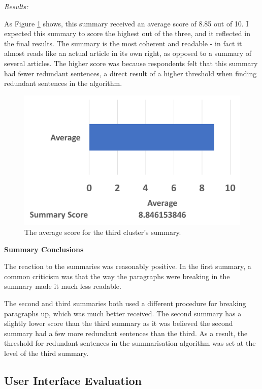 \documentclass[12pt]{article}
\begin{document}
\emph{Results:}

As Figure \ref{summ3} shows, this summary received an average score of 8.85 out of 10. I expected this summary to score the highest out of the three, and it reflected in the final results. The summary is the most coherent and readable - in fact it almost reads like an actual article in its own right, as opposed to a summary of several articles. The higher score was because respondents felt that this summary had fewer redundant sentences, a direct result of a higher threshold when finding redundant sentences in the algorithm. \\

\begin{figure}[ht!]
  \centering
    \includegraphics[scale=0.6]{summ3score.png}
   \caption[The average score for a summary]{The average score for the third cluster's summary.}
   \label{summ3}
\end{figure} 

\textbf{Summary Conclusions}

The reaction to the summaries was reasonably positive. In the first summary, a common criticism was that the way the paragraphs were breaking in the summary made it much less readable. 

The second and third summaries both used a different procedure for breaking paragraphs up, which was much better received. The second summary has a slightly lower score than the third summary as it was believed the second summary had a few more redundant sentences than the third. As a result, the threshold for redundant sentences in the summarisation algorithm was set at the level of the third summary.

\subsection{User Interface Evaluation}
\end{document}

